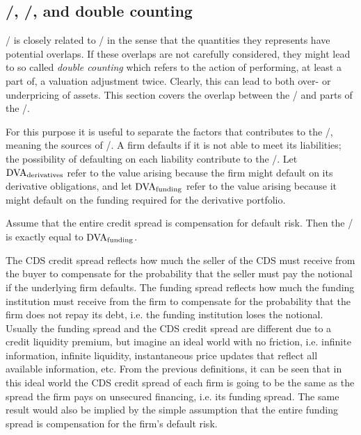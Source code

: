 \documentclass[main.tex]{subfiles}
\begin{document}
    \subsection{\FVA/, \DVA/, and double counting}
    \FVA/ is closely related to \DVA/ in the sense that 
    the quantities they represents have potential overlaps.
    If these overlaps are not carefully considered, 
    they might lead to so called \textit{double counting}
    which refers to the action of performing, at least a part of, a valuation adjustment twice. 
    Clearly, this can lead to both over- or underpricing of assets.
    This section covers the overlap between the \FVA/ and parts of the \DVA/.

    For this purpose it is useful to separate the factors that contributes to the \DVA/,
    meaning the sources of \DVA/. 
    A firm defaults if it is not able to meet its liabilities;
    the possibility of defaulting on each liability contribute to the \DVA/.
    Let $\DVA/_{\text{derivatives}}$ refer to the value arising
    because the firm might default on its derivative obligations,
    and let $\DVA/_{\text{funding}}$ refer to the value arising 
    because it might default on the funding required for the derivative portfolio.

    Assume that the entire credit spread is compensation for default risk.
    Then the \FBA/ is exactly equal to $\DVA/_{\text{funding}}$. 

    The CDS credit spread reflects how much the seller of the CDS must receive from the buyer
    to compensate for the probability that the seller must pay the notional 
    if the underlying firm defaults.
    The funding spread reflects how much the funding institution must receive from the firm 
    to compensate for the probability that the firm does not repay its debt, 
    i.e. the funding institution loses the notional.
    Usually the funding spread and the CDS credit spread 
    are different due to a credit liquidity premium,
    but imagine an ideal world with no friction, i.e. infinite information, infinite liquidity, 
    instantaneous price updates that reflect all available information, etc.
    From the previous definitions, it can be seen that in this ideal world
    the CDS credit spread of each firm is going to be the same 
    as the spread the firm pays on unsecured financing, i.e. its funding spread.
    The same result would also be implied by the simple assumption 
    that the entire funding spread is compensation for the firm's default risk.
\end{document}
